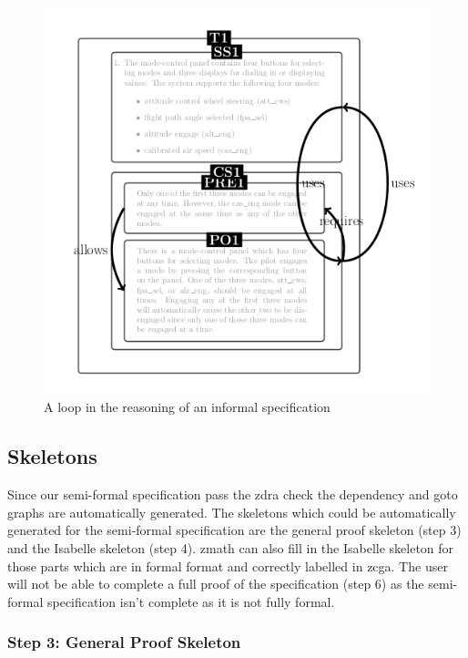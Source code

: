 \begin{figure}[H]
\begin{minipage}{0.45\textwidth}
     \includegraphics[width=\linewidth]{Figures/fullexample/ifincorrectout.png}
     \caption{A loop in the reasoning of an informal specification \label{fig:ifzdraincorrectout}}
     \end{minipage}
     \end{figure}

 \subsection{Skeletons}

 Since our semi-formal specification pass the \gls{zdra} check the dependency and
 goto graphs are automatically generated. The skeletons which could be
 automatically generated for the semi-formal specification are the general proof
 skeleton (step 3) and the Isabelle skeleton (step 4). \Gls{zmath} can also fill
 in the Isabelle skeleton for those parts which are in formal format and
 correctly labelled in \gls{zcga}. The user will not be able to complete a full
 proof of the specification (step 6) as the semi-formal specification isn't
 complete as it is not fully formal.

 \subsubsection{Step 3: General Proof Skeleton}


